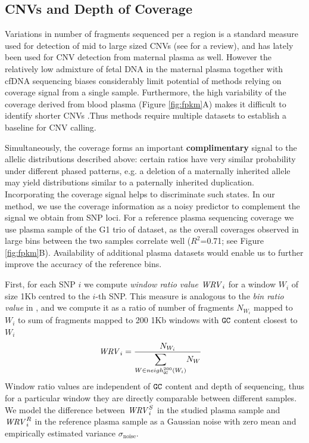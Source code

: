 \subsection{CNVs and Depth of Coverage}\label{ss:coverage}
Variations in number of fragments sequenced per a region is a standard measure used for detection of mid to large sized CNVs (see \cite{medvedev2009} for a review), and has lately been used for CNV detection from maternal plasma \cite{srinivasan2013, chen2013} as well. However the relatively low admixture of fetal DNA in the maternal plasma together with cfDNA sequencing biases considerably limit potential of methods relying on coverage signal from a single sample. Furthermore, the high variability of the coverage derived from blood plasma (Figure \ref{fig:fpkm}A) makes it difficult to identify shorter CNVs .Thus methods \cite{srinivasan2013, chen2013} require multiple datasets to establish a baseline for CNV calling.

Simultaneously, the coverage forms an important \textbf{complimentary} signal to the allelic distributions described above: certain ratios have very similar probability under different phased patterns, e.g. a deletion of a maternally inherited allele may yield distributions similar to a paternally inherited duplication. Incorporating the coverage signal helps to discriminate such states. In our method, we use the coverage information as a noisy predictor to complement the signal we obtain from SNP loci. For a reference plasma sequencing coverage we use plasma sample of the G1 trio of \cite{kitzman2012} dataset, as the overall coverages observed in large bins between the two samples correlate well ($R^2$=0.71; see Figure \ref{fig:fpkm}B). Availability of additional plasma datasets would enable us to further improve the accuracy of the reference bins.

First, for each SNP $i$ we compute \emph{window ratio value} $\mathit{WRV}_i$ for a window $W_i$ of size 1Kb centred to the $i$-th SNP. This measure is analogous to the \emph{bin ratio value} in \cite{srinivasan2013}, and we compute it as a ratio of number of fragments $N_{W_i}$ mapped to $W_i$ to sum of fragments mapped to 200 1Kb windows with $\texttt{G}\texttt{C}$ content closest to $W_i$
\begin{align}
\WRV_i &= \frac{ N_{W_i} }{ \mathlarger{\sum_{W \in neigh_{\G\C}^{200}(W_i)}} N_{W} }
\end{align}
Window ratio values are independent of $\texttt{G}\texttt{C}$ content and depth of sequencing, thus for a particular window they are directly comparable between different samples. We model the difference between $\mathit{WRV}_i^S$ in the studied plasma sample and $\mathit{WRV}_i^R$ in the reference plasma sample as a Gaussian noise with zero mean and empirically estimated variance $\sigma_{\text{noise}}$. 

